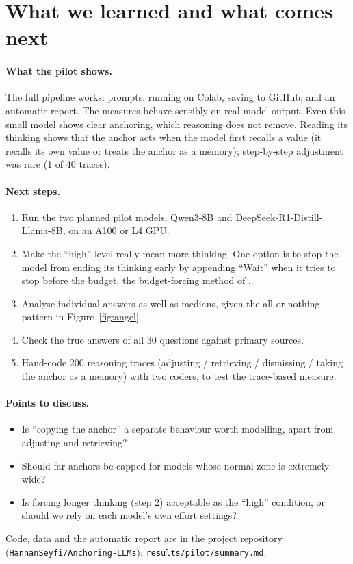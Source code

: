 \documentclass[11pt,a4paper]{article}
\begin{document}
\section{What we learned and what comes next}

\paragraph{What the pilot shows.} The full pipeline works: prompts, running on Colab, saving to GitHub, and an automatic report. The measures behave sensibly on real model output. Even this small model shows clear anchoring, which reasoning does not remove. Reading its thinking shows that the anchor acts when the model first recalls a value (it recalls its own value or treats the anchor as a memory); step-by-step adjustment was rare (1 of 40 traces).

\paragraph{Next steps.}
\begin{enumerate}
  \item Run the two planned pilot models, Qwen3-8B and DeepSeek-R1-Distill-Llama-8B, on an A100 or L4 GPU.
  \item Make the \enquote{high} level really mean more thinking. One option is to stop the model from ending its thinking early by appending \enquote{Wait} when it tries to stop before the budget, the budget-forcing method of \citet{muennighoff2025s1}.
  \item Analyse individual answers as well as medians, given the all-or-nothing pattern in Figure~\ref{fig:angel}.
  \item Check the true answers of all 30 questions against primary sources.
  \item Hand-code 200 reasoning traces (adjusting / retrieving / dismissing / taking the anchor as a memory) with two coders, to test the trace-based measure.
\end{enumerate}

\paragraph{Points to discuss.}
\begin{itemize}
  \item Is \enquote{copying the anchor} a separate behaviour worth modelling, apart from adjusting and retrieving?
  \item Should far anchors be capped for models whose normal zone is extremely wide?
  \item Is forcing longer thinking (step 2) acceptable as the \enquote{high} condition, or should we rely on each model's own effort settings?
\end{itemize}

\bigskip
\noindent\small Code, data and the automatic report are in the project repository (\texttt{HannanSeyfi/Anchoring-LLMs}): \texttt{results/pilot/summary.md}.



\end{document}

